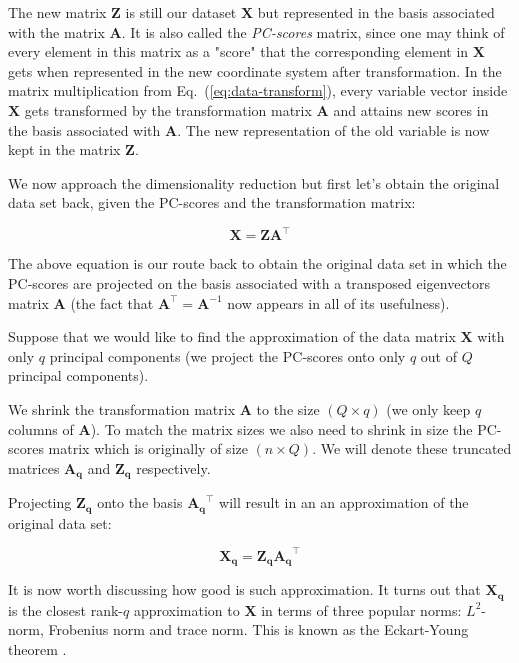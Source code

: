 \documentclass[10pt,twocolumn]{article}
\begin{document}
The new matrix $\mathbf{Z}$ is still our dataset $\mathbf{X}$ but represented in the basis associated with the matrix $\mathbf{A}$. It is also called the \textit{PC-scores} matrix, since one may think of every element in this matrix as a "score" that the corresponding element in $\mathbf{X}$ gets when represented in the new coordinate system after transformation. In the matrix multiplication from Eq.~(\ref{eq:data-transform}), every variable vector inside $\mathbf{X}$ gets transformed by the transformation matrix $\mathbf{A}$ and attains new scores in the basis associated with $\mathbf{A}$. The new representation of the old variable is now kept in the matrix $\mathbf{Z}$.



We now approach the dimensionality reduction but first let's obtain the original data set back, given the PC-scores and the transformation matrix:

\begin{equation} \label{eq:X-retrieval}
\mathbf{X} = \mathbf{Z} \mathbf{A}^{\top}
\end{equation}

The above equation is our route back to obtain the original data set in which the PC-scores are projected on the basis associated with a transposed eigenvectors matrix $\mathbf{A}$ (the fact that $\mathbf{A}^{\top} = \mathbf{A}^{-1}$ now appears in all  of its usefulness).

Suppose that we would like to find the approximation of the data matrix $\mathbf{X}$ with only $q$ principal components (we project the PC-scores onto only $q$ out of $Q$ principal components).

We shrink the transformation matrix $\mathbf{A}$ to the size $(Q \times q)$ (we only keep $q$ columns of $\mathbf{A}$). To match the matrix sizes we also need to shrink in size the PC-scores matrix which is originally of size $(n \times Q)$. We will denote these truncated matrices $\mathbf{A_q}$ and $\mathbf{Z_q}$ respectively.



Projecting $\mathbf{Z_q}$ onto the basis $\mathbf{A_q}^{\top}$ will result in an an approximation of the original data set:

\begin{equation} \label{eq:X-approximation}
\mathbf{X_q} = \mathbf{Z_q} \mathbf{A_q}^{\top}
\end{equation}

It is now worth discussing how good is such approximation. It turns out that $\mathbf{X_q}$ is the closest rank-$q$ approximation to $\mathbf{X}$ in terms of three popular norms: $L^2$-norm, Frobenius norm and trace norm. This is known as the Eckart-Young theorem \cite{eckart-young}.
\end{document}
